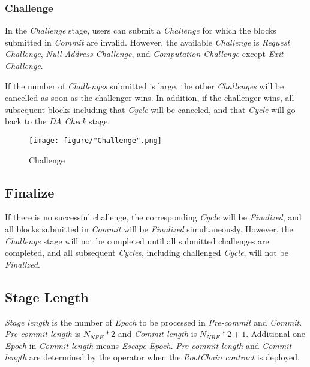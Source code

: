 \documentclass[letterpaper, 11pt]{article}
\begin{document}
\subsubsection{Challenge}
\begin{CJK}{UTF8}{mj}
In the \emph{Challenge} stage, users can submit a \emph{Challenge} for which the blocks submitted in \emph{Commit} are invalid. However, the available \emph{Challenge} is \emph{Request Challenge}, \emph{Null Address Challenge}, and \emph{Computation Challenge} except \emph{Exit Challenge}.

If the number of \emph{Challenges} submitted is large, the other \emph{Challenges} will be cancelled as soon as the challenger wins. In addition, if the challenger wins, all subsequent blocks including that \emph{Cycle} will be canceled, and that \emph{Cycle} will go back to the \emph{DA Check} stage.


\begin{figure}[!h]
\centering
\texttt{[image: figure/"Challenge".png]}
\caption{Challenge}
\label{fig:challenge-block-sequence}
\end{figure}

\end{CJK}


\subsection{Finalize}
\begin{CJK}{UTF8}{mj}
If there is no successful challenge, the corresponding \emph{Cycle} will be \emph{Finalized}, and all blocks submitted in \emph{Commit} will be \emph{Finalized} simultaneously. However, the \emph{Challenge} stage will not be completed until all submitted challenges are completed, and all subsequent \emph{Cycle}s, including challenged \emph{Cycle}, will not be \emph{Finalized}.
\end{CJK}

\subsection{Stage Length}
\begin{CJK}{UTF8}{mj}
\emph{Stage length} is the number of \emph{Epoch} to be processed in \emph{Pre-commit} and \emph{Commit}. \emph{Pre-commit length} is $N_{NRE} * 2$ and \emph{Commit length} is $N_{NRE} * 2 + 1$. Additional one \emph{Epoch} in \emph{Commit length} means \emph{Escape Epoch}. \emph{Pre-commit length} and \emph{Commit length} are determined by the operator when the \emph{RootChain contract} is deployed.
\end{CJK}
\end{document}

